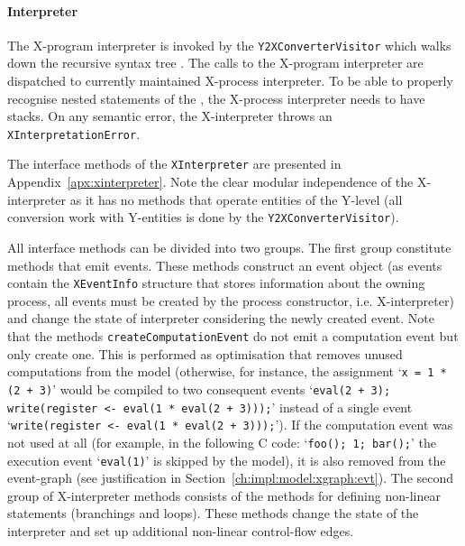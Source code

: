 

\paragraph{Interpreter}
\label{ch:impl:proc:x-compiler:compilation}

The X-program interpreter is invoked by the \texttt{Y2XConverterVisitor} which walks down the recursive syntax tree \ytree{}.
The calls to the X-program interpreter are dispatched to currently maintained X-process interpreter.
To be able to properly recognise nested statements of the \ytree{}, the X-process interpreter needs to have stacks.
On any semantic error, the X-interpreter throws an \texttt{XInterpretationError}.

The interface methods of the \texttt{XInterpreter} are presented in Appendix~\ref{apx:xinterpreter}.
Note the clear modular independence of the X-interpreter as it has no methods that operate entities of the Y-level (all conversion work with Y-entities is done by the \texttt{Y2XConverterVisitor}).

All interface methods can be divided into two groups.
The first group constitute methods that emit events.
These methods construct an event object (as events contain the \texttt{XEventInfo} structure that stores information about the owning process, all events must be created by the process constructor, i.e. X-interpreter) and change the state of interpreter considering the newly created event.
Note that the methods \texttt{createComputationEvent} do not emit a computation event but only create one.
This is performed as optimisation that removes unused computations from the model (otherwise, for instance, the assignment 
`\texttt{x = 1 * (2 + 3)}' would be compiled to two consequent events `\texttt{eval(2 + 3); write(register <- eval(1 * eval(2 + 3)));}' instead of a single event `\texttt{write(register <- eval(1 * eval(2 + 3)));}').
If the computation event was not used at all (for example, in the following C code: `\texttt{foo(); 1; bar();}' the execution event `\texttt{eval(1)}' is skipped by the model), it is also removed from the event-graph (see justification in Section~\ref{ch:impl:model:xgraph:evt}).
The second group of X-interpreter methods consists of the methods for defining non-linear statements (branchings and loops).
These methods change the state of the interpreter and set up additional non-linear control-flow edges.



